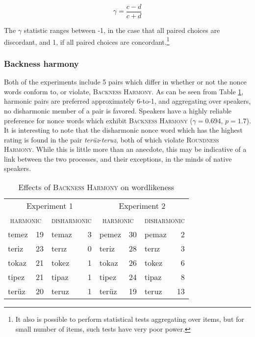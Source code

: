 \begin{equation*}
\displaystyle \gamma = \frac{c - d}{c + d}
\end{equation*}

\noindent
The $\gamma$ statistic ranges between -1, in the case that all paired choices are discordant, and 1, if all paired choices are concordant.\footnote{It also is possible to perform statistical tests aggregating over items, but for small number of items, such tests have very poor power.}

\subsubsection{Backness harmony}

Both of the \citet{Zimmer1969} experiments include 5 pairs which differ in whether or not the nonce words conform to, or violate, \textsc{Backness Harmony}. As can be seen from Table \ref{bhw}, harmonic pairs are preferred approximately 6-to-1, and aggregating over speakers, no disharmonic member of a pair is favored. Speakers have a highly reliable preference for nonce words which exhibit \textsc{Backness Harmony} ($\gamma = 0.694$, $p = 1.7$). It is interesting to note that the disharmonic nonce word which has the highest rating is found in the pair \emph{terüz}-\emph{teruz}, both of which violate \textsc{Roundness Harmony}. While this is little more than an anecdote, this may be  indicative of a link between the two processes, and their exceptions, in the minds of native speakers. 

\begin{table}[t]
\centering
\begin{tabular}{lrlr|lrlr}
\toprule
\multicolumn{4}{c|}{Experiment 1} & \multicolumn{4}{c}{Experiment 2} \\
\multicolumn{2}{c}{\textsc{harmonic}} & \multicolumn{2}{c|}{\textsc{disharmonic}} & \multicolumn{2}{c}{\textsc{harmonic}} & \multicolumn{2}{c}{\textsc{disharmonic}} \\
\midrule
{temez} & 19            & {temaz} & 3 & {pemez} & 30            & {pemaz} & 2 \\
{teriz} & 23            & {terız} & 0 & {teriz} & 28            & {terız} & 3 \\
{tokaz} & 21            & {tokez} & 1 & {tokaz} & 26            & {tokez} & 6 \\
{tipez} & 21            & {tipaz} & 1 & {tipez} & 24            & {tipaz} & 8 \\
{terüz} & 20            & {teruz} & 1 & {terüz} & 19            & {teruz} & 13 \\
\bottomrule
\end{tabular}
\caption{Effects of \textsc{Backness Harmony} on wordlikeness \citep[from][]{Zimmer1969}}
\label{bhw}
\end{table}

